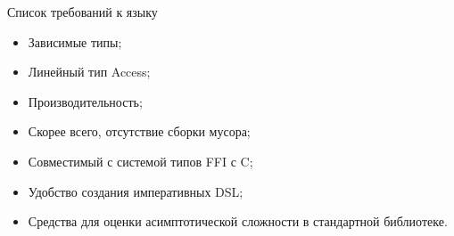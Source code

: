 \documentclass{beamer}
\begin{document}
\begin{frame}{Список требований к языку}
  \begin{itemize}
    \item Зависимые типы;
    \item Линейный тип Access;
    \item Производительность;
    \item Скорее всего, отсутствие сборки мусора;
    \item Совместимый с системой типов FFI с C;
    \item Удобство создания императивных DSL;
    \item Средства для оценки асимптотической сложности в стандартной
      библиотеке.
  \end{itemize}
\end{frame}
\end{document}

